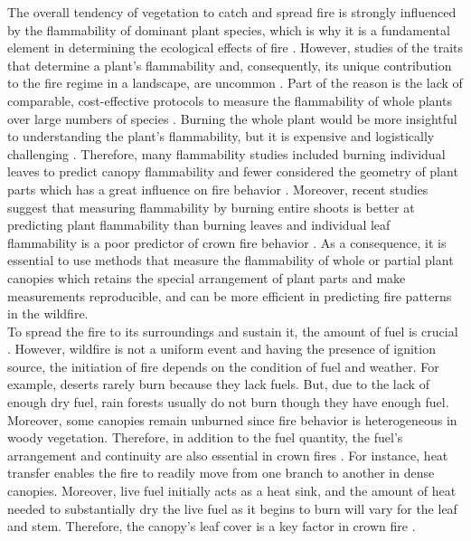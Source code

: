 \documentclass[12pt]{report}
\begin{document}
 The overall tendency of vegetation to catch and spread fire is strongly influenced by the flammability of dominant plant species, which is why it is a fundamental element in determining the ecological effects of fire \citep{bond1995kill, lavorel2002predicting, bond2005fire}. However, studies of the traits that determine a plant's flammability and, consequently, its unique contribution to the fire regime in a landscape, are uncommon \citep{schwilk2015dimensions, pausas2017flammability}. Part of the reason is the lack of comparable, cost-effective protocols to measure the flammability of whole plants over large numbers of species \citep{jaureguiberry2011device}. Burning the whole plant would be more insightful to understanding the plant's flammability, but it is expensive and logistically challenging \citep{jaureguiberry2011device, pausasandmoi2012flammability}. Therefore, many flammability studies included burning individual leaves to predict canopy flammability and fewer considered the geometry of plant parts which has a great influence on fire behavior \citep{schwilk2003flammability, gao2018grass, calitz2015investigating,pausas2012fires}. Moreover, recent studies suggest that measuring flammability by burning entire shoots is better at predicting plant flammability than burning leaves \citep{alam2020shoot} and individual leaf flammability is a poor predictor of crown fire behavior \citep{fernandes2012plant}. As a consequence, it is essential to use methods that measure the flammability of whole or partial plant canopies which retains the special arrangement of plant parts and make measurements reproducible, and can be more efficient in predicting fire patterns in the wildfire.\\

To spread the fire to its surroundings and sustain it, the amount of fuel is crucial \citep{rothermel1972mathematical}. However, wildfire is not a uniform event and having the presence of ignition source, the initiation of fire depends on the condition of fuel and weather. For example, deserts rarely burn because they lack fuels. But, due to the lack of enough dry fuel, rain forests usually do not burn though they have enough fuel. Moreover, some canopies remain unburned since fire behavior is heterogeneous  in woody vegetation. Therefore, in addition to the fuel quantity, the fuel's arrangement and continuity are also essential in crown fires \citep{bond1996fire}. For instance, heat transfer enables the fire to readily move from one branch to another in dense canopies. Moreover, live fuel initially acts as a heat sink, and the amount of heat needed to substantially dry the live fuel as it begins to burn will vary for the leaf and stem. Therefore, the canopy's leaf cover is a key factor in crown fire \citep{ray2005micrometeorological}.\\
\end{document}
